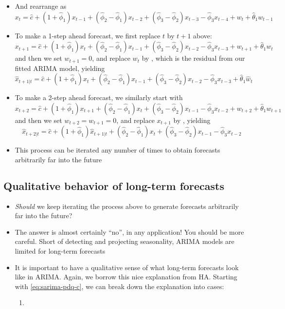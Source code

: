 \documentclass{article}
\begin{document}
\begin{itemize}
\item And rearrange as
  \[
  x_t = \hat{c} + (1 + \hat\phi_1) x_{t-1} + (\hat\phi_2 - \hat\phi_1) x_{t-2} + 
  (\hat\phi_3 - \hat\phi_2) x_{t-3} - \hat\phi_3 x_{t-4} + w_t + \hat\theta_1
  w_{t-1} 
  \]

\item To make a 1-step ahead forecast, we first replace $t$ by $t+1$ above:  
  \[
  x_{t+1} = \hat{c} + (1 + \hat\phi_1) x_t + (\hat\phi_2 - \hat\phi_1) x_{t-1} + 
  (\hat\phi_3 - \hat\phi_2) x_{t-2} - \hat\phi_3 x_{t-3} + w_{t+1} +
  \hat\theta_1 w_t  
  \]
  and then we set $w_{t+1} = 0$, and replace $w_t$ by , which
  is the residual from our fitted ARIMA model, yielding 
  \[
  \hat{x}_{t+1 | t} = \hat{c} + (1 + \hat\phi_1) x_t + (\hat\phi_2 - \hat\phi_1)
  x_{t-1} + (\hat\phi_3 - \hat\phi_2) x_{t-2} - \hat\phi_3 x_{t-3} +
  \hat\theta_1 \hat{w}_t  
  \]

\item To make a 2-step ahead forecast, we similarly start with 
  \[
  x_{t+2} = \hat{c} + (1 + \hat\phi_1) x_{t+1} + (\hat\phi_2 - \hat\phi_1) x_t +
  (\hat\phi_3 - \hat\phi_2) x_{t-1} - \hat\phi_3 x_{t-2} + w_{t+2} +
  \hat\theta_1 w_{t+1}
  \]
  and then we set $w_{t+2} = w_{t+1} = 0$, and replace $x_{t+1}$ by
  , yielding  
  \[
  \hat{x}_{t+2 | t} = \hat{c} + (1 + \hat\phi_1) \hat{x}_{t+1 | t} + (\hat\phi_2
  - \hat\phi_1) x_t + (\hat\phi_3 - \hat\phi_2) x_{t-1} - \hat\phi_3 x_{t-2}  
  \]

\item This process can be iterated any number of times to obtain forecasts
  arbitrarily far into the future 
\end{itemize}

\subsection{Qualitative behavior of long-term forecasts}

\begin{itemize}
\item \emph{Should} we keep iterating the process above to generate forecasts
  arbitrarily far into the future? 

\item The answer is almost certainly ``no'', in any application! You should be 
  more careful. Short of detecting and projecting seasonality, ARIMA models are 
  limited for long-term forecasts 

\item It is important to have a qualitative sense of what long-term forecasts
  look like in ARIMA. Again, we borrow this nice explanation from HA. Starting
  with \eqref{eq:sarima-pdq-c}, we can break down the explanation into cases: 

\begin{enumerate}
\item 
\end{enumerate}

\end{itemize}
\end{document}
